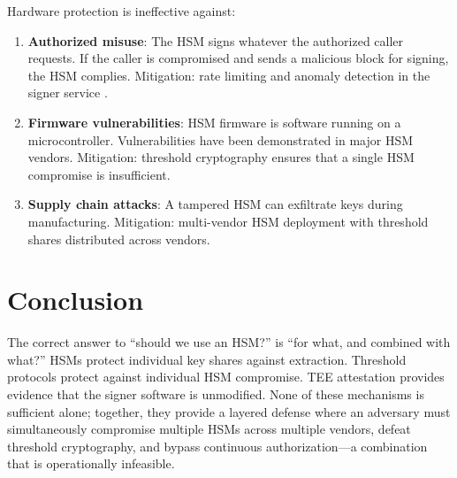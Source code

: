 \documentclass[11pt]{article}
\begin{document}
Hardware protection is ineffective against:
\begin{enumerate}
\item \textbf{Authorized misuse}: The HSM signs whatever the authorized caller requests. If the caller is compromised and sends a malicious block for signing, the HSM complies. Mitigation: rate limiting and anomaly detection in the signer service \cite{zero-trust}.
\item \textbf{Firmware vulnerabilities}: HSM firmware is software running on a microcontroller. Vulnerabilities have been demonstrated in major HSM vendors. Mitigation: threshold cryptography ensures that a single HSM compromise is insufficient.
\item \textbf{Supply chain attacks}: A tampered HSM can exfiltrate keys during manufacturing. Mitigation: multi-vendor HSM deployment with threshold shares distributed across vendors.
\end{enumerate}

\section{Conclusion}

The correct answer to ``should we use an HSM?'' is ``for what, and combined with what?'' HSMs protect individual key shares against extraction. Threshold protocols protect against individual HSM compromise. TEE attestation provides evidence that the signer software is unmodified. None of these mechanisms is sufficient alone; together, they provide a layered defense where an adversary must simultaneously compromise multiple HSMs across multiple vendors, defeat threshold cryptography, and bypass continuous authorization---a combination that is operationally infeasible.
\end{document}
